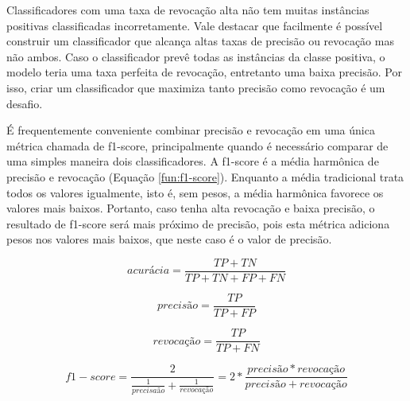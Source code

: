 Classificadores com uma taxa de revocação alta não tem muitas instâncias positivas classificadas incorretamente. Vale destacar que facilmente é possível construir um classificador que alcança altas taxas de precisão ou revocação mas não ambos. Caso o classificador prevê todas as instâncias da classe positiva, o modelo teria uma taxa perfeita de revocação, entretanto uma baixa precisão. Por isso, criar um classificador que maximiza tanto precisão como revocação é um desafio.

É frequentemente conveniente combinar precisão e revocação em uma única métrica chamada de f1-score, principalmente quando é necessário comparar de uma simples maneira dois classificadores. A f1-score é a média harmônica de precisão e revocação (Equação \ref{fun:f1-score}). Enquanto a média tradicional trata todos os valores igualmente, isto é, sem pesos, a média harmônica favorece os valores mais baixos. Portanto, caso tenha alta revocação e baixa precisão, o resultado de f1-score será mais próximo de precisão, pois esta métrica adiciona pesos nos valores mais baixos, que neste caso é o valor de precisão.  

\begin{equation}
\label{fun:acurracy}
acurácia = \frac{TP + TN}{TP + TN + FP + FN} 
\end{equation}


\begin{equation}
\label{fun:precision}
precisão = \frac{TP}{TP + FP} 
\end{equation}

\begin{equation}
\label{fun:recall}
revocação = \frac{TP}{TP + FN} 
\end{equation}

\begin{equation}
\label{fun:f1-score}
f1-score = \frac{2}{\frac{1}{precisaão} + \frac{1}{revocação}} = 2 * \frac{precisão * revocação}{precisão + revocação}
\end{equation}




